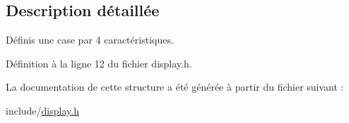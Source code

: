 \subsection{Description détaillée}
Définis une case par 4 caractéristiques. 

Définition à la ligne 12 du fichier display.\+h.



La documentation de cette structure a été générée à partir du fichier suivant \+:\begin{DoxyCompactItemize}
\item 
include/\hyperlink{display_8h}{display.\+h}\end{DoxyCompactItemize}
